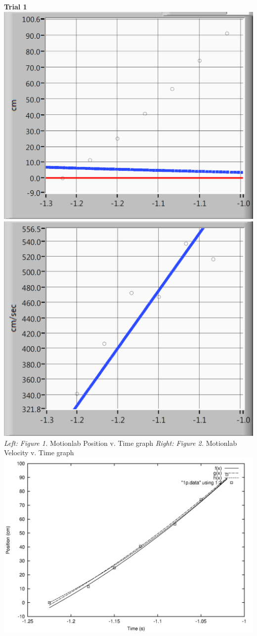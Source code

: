 \documentclass[12pt,letterpaper]{article}
\begin{document}
\textbf{Trial 1}
\newline\newline
\includegraphics[scale=0.47]{r1p.png}
\includegraphics[scale=0.47]{r1v.png}
\textit{Left: Figure 1.} Motionlab Position v. Time graph \textit{Right: Figure 2.} Motionlab Velocity v. Time graph
\newline
\includegraphics[scale=0.6]{1p.png}
\end{document}

